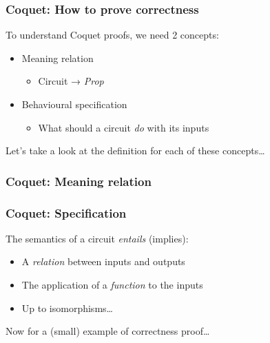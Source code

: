         \begin{frame}
            \frametitle{Coquet: How to prove correctness}

            \par{To understand Coquet proofs, we need 2 concepts:}
            \begin{itemize}
                \item Meaning relation
                    \begin{itemize}
                        \item Circuit → \emph{Prop}
                    \end{itemize}
                \item Behavioural specification
                    \begin{itemize}
                        \item What should a circuit \emph{do} with its inputs
                    \end{itemize}
            \end{itemize}
            \vspace{0.5cm}
            \par{Let's take a look at the definition for each of these concepts\ldots}
        \end{frame}

        \begin{frame}
            \frametitle{Coquet: Meaning relation}
        \end{frame}

        \begin{frame}
            \frametitle{Coquet: Specification}

            \vspace{0.5cm}
            \par{The semantics of a circuit \emph{entails} (implies):}
            \begin{itemize}
                \item A \emph{relation} between inputs and outputs
                \item The application of a \emph{function} to the inputs
                \item Up to isomorphisms\ldots
            \end{itemize}
            \par{Now for a (small) example of correctness proof\ldots}
        \end{frame}


